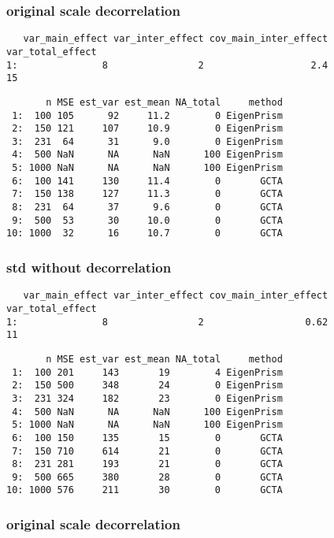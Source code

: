 \documentclass[]{article}
\begin{document}
\subsubsection{original scale
decorrelation}\label{original-scale-decorrelation-1}

\begin{verbatim}
   var_main_effect var_inter_effect cov_main_inter_effect var_total_effect
1:               8                2                   2.4               15
\end{verbatim}

\begin{verbatim}
       n MSE est_var est_mean NA_total     method
 1:  100 105      92     11.2        0 EigenPrism
 2:  150 121     107     10.9        0 EigenPrism
 3:  231  64      31      9.0        0 EigenPrism
 4:  500 NaN      NA      NaN      100 EigenPrism
 5: 1000 NaN      NA      NaN      100 EigenPrism
 6:  100 141     130     11.4        0       GCTA
 7:  150 138     127     11.3        0       GCTA
 8:  231  64      37      9.6        0       GCTA
 9:  500  53      30     10.0        0       GCTA
10: 1000  32      16     10.7        0       GCTA
\end{verbatim}

\subsubsection{std without
decorrelation}\label{std-without-decorrelation}

\begin{verbatim}
   var_main_effect var_inter_effect cov_main_inter_effect var_total_effect
1:               8                2                  0.62               11
\end{verbatim}

\begin{verbatim}
       n MSE est_var est_mean NA_total     method
 1:  100 201     143       19        4 EigenPrism
 2:  150 500     348       24        0 EigenPrism
 3:  231 324     182       23        0 EigenPrism
 4:  500 NaN      NA      NaN      100 EigenPrism
 5: 1000 NaN      NA      NaN      100 EigenPrism
 6:  100 150     135       15        0       GCTA
 7:  150 710     614       21        0       GCTA
 8:  231 281     193       21        0       GCTA
 9:  500 665     380       28        0       GCTA
10: 1000 576     211       30        0       GCTA
\end{verbatim}

\subsubsection{original scale
decorrelation}\label{original-scale-decorrelation-2}
\end{document}
